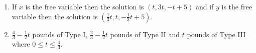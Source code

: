 \documentclass{ximera}
\begin{document}
\begin{enumerate}
Inconsistent\\
No solution


\item If $x$ is the free variable then the solution is $(t, 3t, -t + 5)$ and if $y$ is the free variable then the solution is $\left(\frac{1}{3}t, t, -\frac{1}{3}t + 5\right)$.


\item $\frac{4}{3}- \frac{1}{2}t$ pounds of Type I, $\frac{2}{3} - \frac{1}{2}t$ pounds of Type II and $t$ pounds of Type III where $0 \leq t \leq \frac{4}{3}$.

\end{enumerate}
\end{document}
